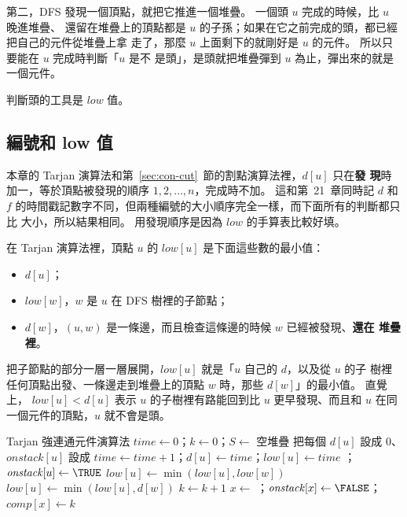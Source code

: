 第二，DFS 發現一個頂點，就把它推進一個堆疊。 一個頭 $u$ 完成的時候，比 $u$ 晚進堆疊、
還留在堆疊上的頂點都是 $u$ 的子孫；如果在它之前完成的頭，都已經把自己的元件從堆疊上拿
走了，那麼 $u$ 上面剩下的就剛好是 $u$ 的元件。 所以只要能在 $u$ 完成時判斷「$u$ 是不
是頭」，是頭就把堆疊彈到 $u$ 為止，彈出來的就是一個元件。

判斷頭的工具是 $\mathit{low}$ 值。

\subsection{編號和 low 值}

本章的 Tarjan 演算法和第~\ref{sec:con-cut}~節的割點演算法裡，$d[u]$ 只在\textbf{發
現}時加一，等於頂點被發現的順序 $1, 2, \ldots, n$，完成時不加。 這和第~21~章同時記
$d$ 和 $f$ 的時間戳記數字不同，但兩種編號的大小順序完全一樣，而下面所有的判斷都只比
大小，所以結果相同。 用發現順序是因為 $\mathit{low}$ 的手算表比較好填。

\begin{definition}
在 Tarjan 演算法裡，頂點 $u$ 的 $\mathit{low}[u]$ 是下面這些數的最小值：
\begin{itemize}
\item $d[u]$；
\item $\mathit{low}[w]$，$w$ 是 $u$ 在 DFS 樹裡的子節點；
\item $d[w]$，$(u, w)$ 是一條邊，而且檢查這條邊的時候 $w$ 已經被發現、\textbf{還在
堆疊裡}。
\end{itemize}
\end{definition}

把子節點的部分一層一層展開，$\mathit{low}[u]$ 就是「$u$ 自己的 $d$，以及從 $u$ 的子
樹裡任何頂點出發、一條邊走到堆疊上的頂點 $w$ 時，那些 $d[w]$」的最小值。 直覺上，
$\mathit{low}[u] < d[u]$ 表示 $u$ 的子樹裡有路能回到比 $u$ 更早發現、而且和 $u$ 在同
一個元件的頂點，$u$ 就不會是頭。

\begin{pseudo}[label=alg:con-tarjan]{Tarjan 強連通元件演算法}
    \State $\mathit{time} \gets 0$；$k \gets 0$；$S \gets$ 空堆疊
    \State 把每個 $d[u]$ 設成 $0$、$\mathit{onstack}[u]$ 設成 \FALSE
            \State {}
        \EndIf
    \EndFor
\EndProcedure
{}
    \State $\mathit{time} \gets \mathit{time} + 1$；$d[u] \gets \mathit{time}$；$\mathit{low}[u] \gets \mathit{time}$
    \State {}；$\mathit{onstack}[u] \gets \TRUE$
         
            \State {}
            \State $\mathit{low}[u] \gets \min(\mathit{low}[u], \mathit{low}[w])$
         
            \State $\mathit{low}[u] \gets \min(\mathit{low}[u], d[w])$
        \EndIf
    \EndFor
     
        \State $k \gets k + 1$
        \Repeat
            \State $x \gets$ ；$\mathit{onstack}[x] \gets \FALSE$；$\mathit{comp}[x] \gets k$
    \EndIf
\EndProcedure
\end{pseudo}

